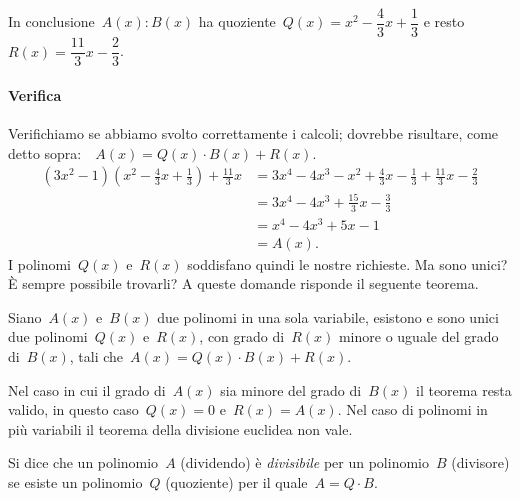 \begin{exrig}
\begin{esempio}
In conclusione~$A(x):B(x)$ ha quoziente~$Q(x)=x^{2}-\dfrac{4}{3}x+\dfrac{1}{3}$ e resto~$R(x)={\dfrac{11}{3}}x-\dfrac{2}{3}$.

\paragraph{Verifica}
Verifichiamo se abbiamo svolto correttamente i calcoli; dovrebbe risultare, come detto sopra:$\quad A(x)=Q(x)\cdot B(x)+R(x)$.
\begin{equation*}
\begin{split}
\left(3x^{2}-1\right)\left(x^{2}-\frac{4}{3}x+\frac{1}{3}\right)+\frac{11}{3}x &= 3x^{4}-4x^{3}-x^{2}+\frac{4}{3}x-\frac{1}{3}+\frac{11}{3}x-\frac{2}{3}\\
                                        &= 3x^{4}-4x^{3}+\frac{15}{3}x-\frac{3}{3}\\
                                        &=x^{4}-4x^{3}+5x-1\\
                                        &=A(x).
\end{split}
\end{equation*}
I polinomi~$Q(x)$ e~$R(x)$ soddisfano quindi le nostre richieste. Ma sono unici? È sempre possibile trovarli? A queste domande risponde il seguente teorema.
 \end{esempio}
\end{exrig}

\begin{teorema}
 Siano~$A(x)$ e~$B(x)$ due polinomi in una sola variabile, esistono e sono unici due polinomi~$Q(x)$ e~$R(x)$, con grado di~$R(x)$
 minore o uguale del grado di~$B(x)$, tali che~$A(x)=Q(x)\cdot B(x)+R(x)$.
\end{teorema}

\osservazione Nel caso in cui il grado di~$A(x)$ sia minore del grado di~$B(x)$ il teorema resta valido, in questo caso~$Q(x)=0$ e~$R(x)=A(x)$.
Nel caso di polinomi in più variabili il teorema della divisione euclidea non vale.

\begin{definizione}
 Si dice che un polinomio~$A$ (dividendo) è \emph{divisibile} per un polinomio~$B$ (divisore)
 se esiste un polinomio~$Q$ (quoziente) per il quale~$A=Q\cdot B$.
\end{definizione}

